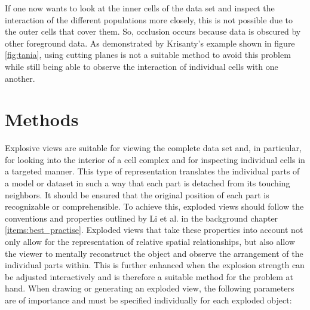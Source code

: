 If one now wants to look at the inner cells of the data set and inspect the interaction of the different populations more closely, this is not possible due to the outer cells that cover them. 
So, occlusion occurs because data is obscured by other foreground data.
As demonstrated by Krisanty's example shown in figure \ref{fig:tania}, using cutting planes is not a suitable method to avoid this problem while still being able to observe the interaction of individual cells with one another.

\section{Methods}
Explosive views are suitable for viewing the complete data set and, in particular, for looking into the interior of a cell complex and for inspecting individual cells in a targeted manner. 
This type of representation translates the individual parts of a model or dataset in such a way that each part is detached from its touching neighbors.
It should be ensured that the original position of each part is recognizable or comprehensible. 
To achieve this, exploded views should follow the conventions and properties outlined by Li et al. in the background chapter \ref{items:best_practise}.
Exploded views that take these properties into account not only allow for the representation of relative spatial relationships, but also allow the viewer to mentally reconstruct the object and observe the arrangement of the individual parts within. 
This is further enhanced when the explosion strength can be adjusted interactively and is therefore a suitable method for the problem at hand.
When drawing or generating an exploded view, the following parameters are of importance and must be specified individually for each exploded object:
